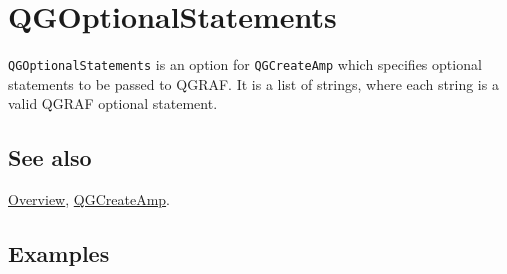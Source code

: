 \documentclass[../FeynHelpersManual.tex]{subfiles}
\begin{document}
\hypertarget{qgoptionalstatements}{
\section{QGOptionalStatements}\label{qgoptionalstatements}}

\texttt{QGOptionalStatements} is an option for \texttt{QGCreateAmp}
which specifies optional statements to be passed to QGRAF. It is a list
of strings, where each string is a valid QGRAF optional statement.

\subsection{See also}

\hyperlink{toc}{Overview}, \hyperlink{qgcreateamp}{QGCreateAmp}.

\subsection{Examples}
\end{document}
